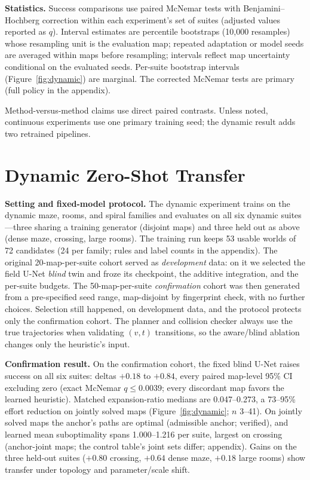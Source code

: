 \documentclass[letterpaper]{article} %
\begin{document}
\textbf{Statistics.}  Success comparisons use paired McNemar tests with Benjamini--Hochberg correction within each experiment's set of suites (adjusted values reported as $q$). Interval estimates are percentile bootstraps (10{,}000 resamples) whose resampling unit is the evaluation map; repeated adaptation or model seeds are averaged within maps before resampling; intervals reflect map uncertainty conditional on the evaluated seeds. Per-suite bootstrap intervals (Figure~\ref{fig:dynamic}) are marginal. The corrected McNemar tests are primary (full policy in the appendix).

Method-versus-method claims use direct paired contrasts. Unless noted, continuous experiments use one primary training seed; the dynamic result adds two retrained pipelines.

\section{Dynamic Zero-Shot Transfer}

\textbf{Setting and fixed-model protocol.} The dynamic experiment trains on the dynamic maze, rooms, and spiral families and evaluates on all six dynamic suites---three sharing a training generator (disjoint maps) and three held out as above (dense maze, crossing, large rooms). The training run keeps 53 usable worlds of 72 candidates (24 per family; rules and label counts in the appendix). The original 20-map-per-suite cohort served as \emph{development} data: on it we selected the field U-Net \emph{blind} twin and froze its checkpoint, the additive integration, and the per-suite budgets. The 50-map-per-suite \emph{confirmation} cohort was then generated from a pre-specified seed range, map-disjoint by fingerprint check, with no further choices. Selection still happened, on development data, and the protocol protects only the confirmation cohort. The planner and collision checker always use the true trajectories when validating $(v,t)$ transitions, so the aware/blind ablation changes only the heuristic's input.

\textbf{Confirmation result.} On the confirmation cohort, the fixed blind U-Net raises success on all six suites: deltas $+0.18$ to $+0.84$, every paired map-level 95\% CI excluding zero (exact McNemar $q \leq 0.0039$; every discordant map favors the learned heuristic). Matched expansion-ratio medians are 0.047--0.273, a 73--95\% effort reduction on jointly solved maps (Figure~\ref{fig:dynamic}; $n$ 3--41). On jointly solved maps the anchor's paths are optimal (admissible anchor; verified), and learned mean suboptimality spans 1.000--1.216 per suite, largest on crossing (anchor-joint maps; the control table's joint sets differ; appendix). Gains on the three held-out suites ($+0.80$ crossing, $+0.64$ dense maze, $+0.18$ large rooms) show transfer under topology and parameter/scale shift.
\end{document}
